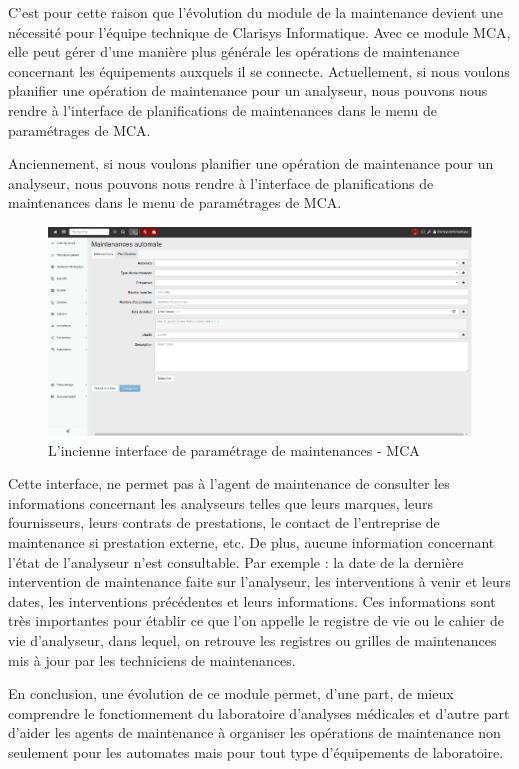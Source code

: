 C’est pour cette raison que l’évolution du module de la maintenance devient 
une nécessité pour l’équipe technique de Clarisys Informatique. Avec ce module MCA, 
elle peut gérer d’une manière plus générale les opérations de maintenance concernant 
les équipements auxquels il se connecte.
Actuellement, si nous voulons planifier une opération de maintenance pour un analyseur, 
nous pouvons nous rendre à l’interface de planifications de maintenances dans le menu de
 paramétrages de MCA.

Anciennement, si nous voulons planifier une opération de maintenance pour un analyseur, 
nous pouvons nous rendre à l’interface de planifications de maintenances dans le menu 
de paramétrages de MCA.
\begin{figure}[hp]
    \centering
    \includegraphics{images/old_interface_maint.png}
    \caption{L'incienne interface de paramétrage de maintenances - MCA}
\end{figure}

Cette interface, ne permet pas à l’agent de maintenance de consulter les informations 
concernant les analyseurs telles que leurs marques, leurs fournisseurs, leurs contrats 
de prestations, le contact de l’entreprise de maintenance si prestation externe, etc.
De plus, aucune information concernant l’état de l’analyseur n’est consultable. 
Par exemple : la date de la dernière intervention de maintenance faite sur l’analyseur, 
les interventions à venir et leurs dates, les interventions précédentes et leurs 
informations.
Ces informations sont très importantes pour établir ce que l’on appelle le registre 
de vie ou le cahier de vie d’analyseur, dans lequel, on retrouve les registres ou 
grilles de maintenances mis à jour par les techniciens de maintenances.

En conclusion, une évolution de ce module permet, d’une part, de mieux comprendre 
le fonctionnement du laboratoire d’analyses médicales et d’autre part d’aider les 
agents de maintenance à organiser les opérations de maintenance non seulement 
pour les automates mais pour tout type d’équipements de laboratoire.
\pagebreak